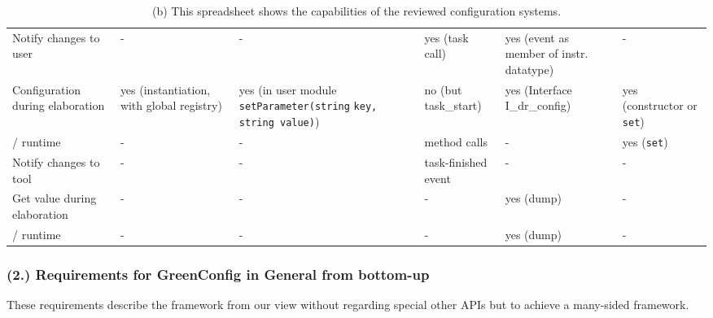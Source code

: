 \begin{landscape}
\begin{table}[H]
\begin{tabularx}{23cm}{|X|X|X|X|X|X|}
		\cline{1-1}\cline{2-2}\cline{3-3}\cline{4-4}\cline{5-5}\cline{6-6}
		Notify changes to user   & -   & -   & yes (task call)   & yes (event as member of instr. datatype)   & -  \\ 
		\cline{1-1}\cline{2-2}\cline{3-3}\cline{4-4}\cline{5-5}\cline{6-6}
		Configuration during elaboration   & yes (instantiation, with global registry)   & yes (in user module \lstinline|setParameter(string| \newline \lstinline|key, string value)|)   & no (but task\_start)   & yes (Interface I\_dr\_config)   & yes (constructor or \lstinline|set|)  \\ 
		\cline{1-1}\cline{2-2}\cline{3-3}\cline{4-4}\cline{5-5}\cline{6-6}
		 / runtime   & -   & -   & method calls   & -   & yes (\lstinline|set|)  \\ 
		\cline{1-1}\cline{2-2}\cline{3-3}\cline{4-4}\cline{5-5}\cline{6-6}
		Notify changes to tool   & -   & -   & task-finished event   & -   & -  \\ 
		\cline{1-1}\cline{2-2}\cline{3-3}\cline{4-4}\cline{5-5}\cline{6-6}
		Get value during elaboration    & -   & -   & -   & yes (dump)   & -  \\ 
		\cline{1-1}\cline{2-2}\cline{3-3}\cline{4-4}\cline{5-5}\cline{6-6}
		 / runtime   & -   & -   & -   & yes (dump)   & -  \\ 
		\hline
	\end{tabularx}
	\caption{(b) This spreadsheet shows the capabilities of the reviewed configuration systems.}
	\label{tbl:capabilitiesb}
\end{table}
\end{landscape}




\subsubsection{(2.) Requirements for GreenConfig in General from bottom-up}
\label{lab:requ2}
These requirements describe the framework from our view without regarding special other APIs but to achieve a many-sided framework. 

